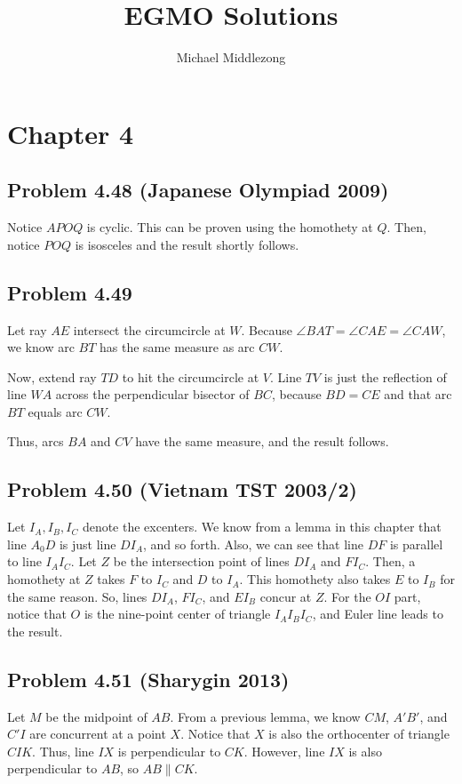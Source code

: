 \documentclass{scrartcl}
\title{EGMO Solutions}
\author{Michael Middlezong}
\begin{document}
\maketitle

\section*{Chapter 4}
\subsection*{Problem 4.48 (Japanese Olympiad 2009)}
Notice $APOQ$ is cyclic. This can be proven using the homothety at $Q$. Then, notice $POQ$ is isosceles and the result shortly follows.
\subsection*{Problem 4.49}
Let ray $AE$ intersect the circumcircle at $W$. Because $\angle BAT = \angle CAE = \angle CAW$, we know arc $BT$ has the same measure as arc $CW$.

Now, extend ray $TD$ to hit the circumcircle at $V$. Line $TV$ is just the reflection of line $WA$ across the perpendicular bisector of $BC$, because $BD = CE$ and that arc $BT$ equals arc $CW$.

Thus, arcs $BA$ and $CV$ have the same measure, and the result follows.
\subsection*{Problem 4.50 (Vietnam TST 2003/2)}
Let $I_A, I_B, I_C$ denote the excenters.
We know from a lemma in this chapter that line $A_0D$ is just line $DI_A$, and so forth. Also, we can see that line $DF$ is parallel to line $I_AI_C$. Let $Z$ be the intersection point of lines $DI_A$ and $FI_C$. Then, a homothety at $Z$ takes $F$ to $I_C$ and $D$ to $I_A$. This homothety also takes $E$ to $I_B$ for the same reason. So, lines $DI_A$, $FI_C$, and $EI_B$ concur at $Z$. For the $OI$ part, notice that $O$ is the nine-point center of triangle $I_AI_BI_C$, and Euler line leads to the result.
\subsection*{Problem 4.51 (Sharygin 2013)}
Let $M$ be the midpoint of $AB$. From a previous lemma, we know $CM$, $A'B'$, and $C'I$ are concurrent at a point $X$. Notice that $X$ is also the orthocenter of triangle $CIK$. Thus, line $IX$ is perpendicular to $CK$. However, line $IX$ is also perpendicular to $AB$, so $AB \parallel CK$.
\end{document}
